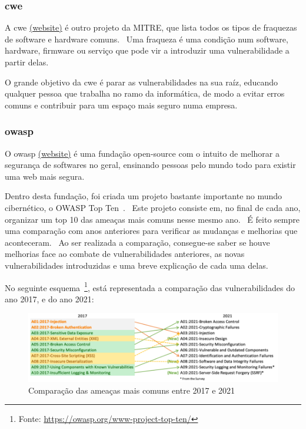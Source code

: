 \documentclass{report}
\begin{document}
\subsubsection{\ac{cwe}}
A \ac{cwe} \href{https://cwe.mitre.org/}{(website)} é outro projeto da MITRE, que lista todos os tipos de fraquezas de software e hardware comuns. \ Uma fraqueza é uma condição num software, hardware, firmware ou serviço que pode vir a introduzir uma vulnerabilidade a partir delas. \par
O grande objetivo da \ac{cwe} é parar as vulnerabilidades na sua raíz, educando qualquer pessoa que trabalha no ramo da informática, de modo a evitar erros comuns e contribuir para um espaço mais seguro numa empresa.

\subsubsection{\ac{owasp}}
O \ac{owasp} \href{https://owasp.org/}{(website)} é uma fundação open-source com o intuito de melhorar a segurança de softwares no geral, ensinando pessoas pelo mundo todo para existir uma web mais segura. \bigskip

Dentro desta fundação, foi criada um projeto bastante importante no mundo cibernético, o OWASP Top Ten~\cite{top-10}. \ Este projeto consiste em, no final de cada ano, organizar um top 10 das ameaças mais comuns nesse mesmo ano. \ É feito sempre uma comparação com anos anteriores para verificar as mudanças e melhorias que aconteceram. \ Ao ser realizada a comparação, consegue-se saber se houve melhorias face ao combate de vulnerabilidades anteriores, as novas vulnerabilidades introduzidas e uma breve explicação de cada uma delas. \bigskip

No seguinte esquema~\footnote{Fonte: \url{https://owasp.org/www-project-top-ten/}}, está representada a comparação das vulnerabilidades do ano 2017, e do ano 2021:

\begin{figure}[h]
    \centering
    \includegraphics[width=350pt]{top10-2021}
    \caption{Comparação das ameaças mais comuns entre 2017 e 2021}
    \label{fig:top10-2021}
\end{figure}
\end{document}
